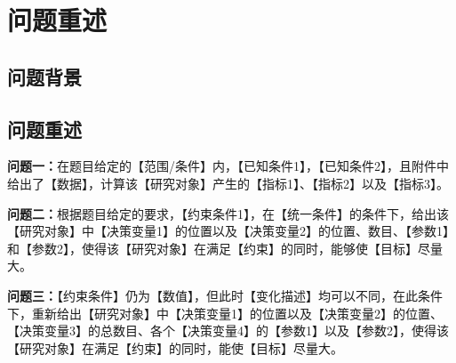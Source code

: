 
\section{问题重述}

\subsection{问题背景}




\subsection{问题重述}


\textbf{问题一：}在题目给定的【范围/条件】内，【已知条件1】，【已知条件2】，且附件中给出了【数据】，计算该【研究对象】产生的【指标1】、【指标2】以及【指标3】。

\textbf{问题二：}根据题目给定的要求，【约束条件1】，在【统一条件】的条件下，给出该【研究对象】中【决策变量1】的位置以及【决策变量2】的位置、数目、【参数1】和【参数2】，使得该【研究对象】在满足【约束】的同时，能够使【目标】尽量大。

\textbf{问题三：}【约束条件】仍为【数值】，但此时【变化描述】均可以不同，在此条件下，重新给出【研究对象】中【决策变量1】的位置以及【决策变量2】的位置、【决策变量3】的总数目、各个【决策变量4】的【参数1】以及【参数2】，使得该【研究对象】在满足【约束】的同时，能使【目标】尽量大。
